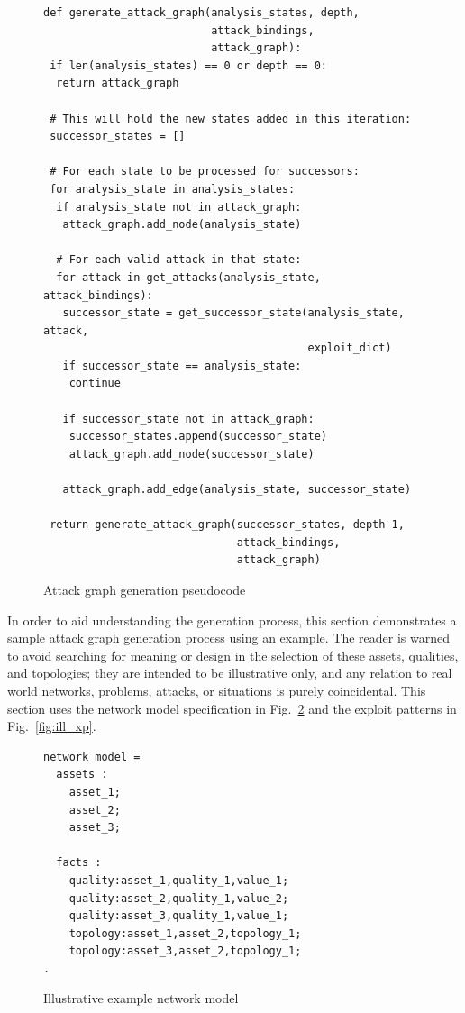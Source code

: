 \begin{figure}
\begin{lstlisting}
def generate_attack_graph(analysis_states, depth, 
                          attack_bindings,
                          attack_graph):
 if len(analysis_states) == 0 or depth == 0:
  return attack_graph
 
 # This will hold the new states added in this iteration:
 successor_states = []

 # For each state to be processed for successors:
 for analysis_state in analysis_states:
  if analysis_state not in attack_graph:
   attack_graph.add_node(analysis_state)

  # For each valid attack in that state:
  for attack in get_attacks(analysis_state, attack_bindings):
   successor_state = get_successor_state(analysis_state, attack,
                                         exploit_dict)
   if successor_state == analysis_state:
    continue
       
   if successor_state not in attack_graph:
    successor_states.append(successor_state)
    attack_graph.add_node(successor_state)
   
   attack_graph.add_edge(analysis_state, successor_state)
      
 return generate_attack_graph(successor_states, depth-1,
                              attack_bindings,
                              attack_graph)
\end{lstlisting}
\caption{Attack graph generation pseudocode}
\label{fig:ag_generation_pc}
\end{figure}
In order to aid understanding the generation process, this section demonstrates a
sample attack graph generation process using an example. The reader is warned to
avoid searching for meaning or design in the selection of these assets, qualities,
and topologies; they are intended to be illustrative only, and any relation to 
real world networks, problems, attacks, or situations is purely coincidental.
This section uses the network model specification in Fig.~\ref{fig:ill_nm}
and the exploit patterns in Fig.~\ref{fig:ill_xp}.
\begin{figure}
\begin{lstlisting}
network model = 
  assets :
    asset_1;
    asset_2;
    asset_3;

  facts :
    quality:asset_1,quality_1,value_1;
    quality:asset_2,quality_1,value_2;
    quality:asset_3,quality_1,value_1;
    topology:asset_1,asset_2,topology_1;
    topology:asset_3,asset_2,topology_1;
.
\end{lstlisting}
\caption{Illustrative example network model}
\label{fig:ill_nm}
\end{figure}

